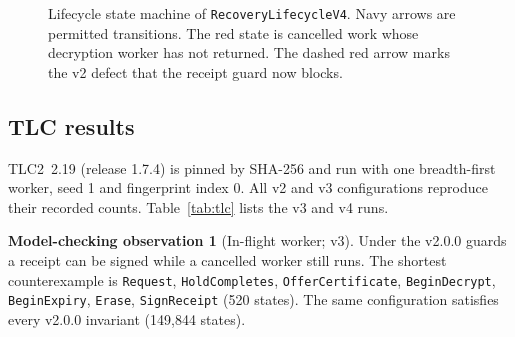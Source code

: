 \documentclass[pdflatex,sn-mathphys-num]{sn-jnl}
\theoremstyle{plain}
\theoremstyle{definition}
\newtheorem{observation}{Model-checking observation}
\newcommand{\code}[1]{\texttt{#1}}
\begin{document}
\begin{figure}[t]
\centering
\resizebox{\linewidth}{!}{}
\caption{Lifecycle state machine of \code{RecoveryLifecycleV4}. Navy arrows are permitted transitions. The red state is cancelled work whose decryption worker has not returned. The dashed red arrow marks the v2 defect that the receipt guard now blocks.}\label{fig:lifecycle}
\end{figure}

\subsection{TLC results}
TLC2~2.19 (release 1.7.4) is pinned by SHA-256 and run with one breadth-first worker, seed 1 and fingerprint index 0. All v2 and v3 configurations reproduce their recorded counts. Table~\ref{tab:tlc} lists the v3 and v4 runs.

\begin{observation}[In-flight worker; v3]\label{obs:inflight}
Under the v2.0.0 guards a receipt can be signed while a cancelled worker still runs. The shortest counterexample is \code{Request}, \code{HoldCompletes}, \code{OfferCertificate}, \code{BeginDecrypt}, \code{BeginExpiry}, \code{Erase}, \code{SignReceipt} (520 states). The same configuration satisfies every v2.0.0 invariant (149,844 states).
\end{observation}
\end{document}
